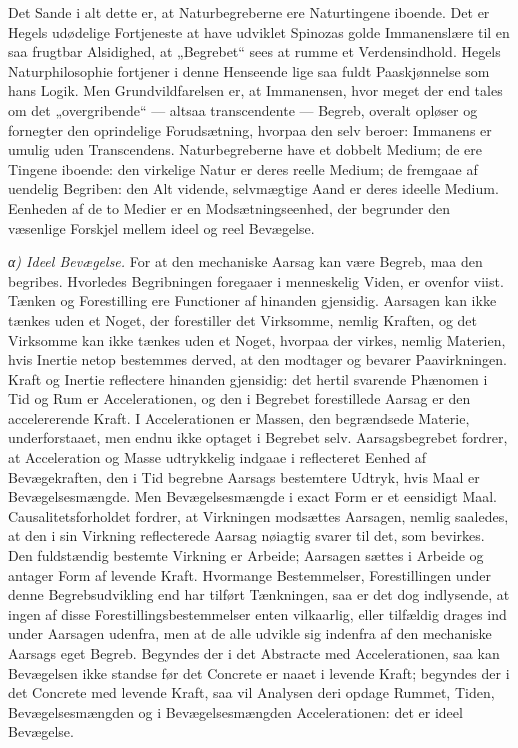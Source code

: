 \documentclass[12pt,a4paper]{book}
\newcommand{\subrunin}[1]{\emph{#1}\hspace{0.4em}}
\begin{document}
Det Sande i alt dette er, at Naturbegreberne ere Naturtingene iboende.
Det er Hegels udødelige Fortjeneste at have udviklet Spinozas golde
Immanenslære til en saa frugtbar Alsidighed, at „Begrebet“ sees at
rumme et Verdensindhold. Hegels Naturphilosophie fortjener i denne
Henseende lige saa fuldt Paaskjønnelse som hans Logik. Men
Grundvildfarelsen er, at Immanensen, hvor meget der end tales om det
„overgribende“ --- altsaa transcendente --- Begreb, overalt opløser og
fornegter den oprindelige Forudsætning, hvorpaa den selv beroer:
Immanens er umulig uden Transcendens. Naturbegreberne have et dobbelt
Medium; de ere Tingene iboende: den virkelige Natur er deres reelle
Medium; de fremgaae af uendelig Begriben: den Alt vidende, selvmægtige
Aand er deres ideelle Medium. Eenheden af de to Medier er en
Modsætningseenhed, der begrunder den væsenlige Forskjel mellem ideel og
reel Bevægelse.

\subrunin{α) Ideel Bevægelse.} For at den mechaniske Aarsag kan være
Begreb, maa den begribes. Hvorledes Begribningen foregaaer i
menneskelig Viden, er ovenfor viist. Tænken og Forestilling ere
Functioner af hinanden gjensidig. Aarsagen kan ikke tænkes uden et
Noget, der forestiller det Virksomme, nemlig Kraften, og det Virksomme
kan ikke tænkes uden et Noget, hvorpaa der virkes, nemlig Materien,
hvis Inertie netop bestemmes derved, at den modtager og bevarer
Paavirkningen. Kraft og Inertie reflectere hinanden gjensidig: det
hertil svarende Phænomen i Tid og Rum er Accelerationen, og den i
Begrebet forestillede Aarsag er den
accelererende Kraft. I Accelerationen er Massen, den begrændsede
Materie, underforstaaet, men endnu ikke optaget i Begrebet selv.
Aarsagsbegrebet fordrer, at Acceleration og Masse udtrykkelig indgaae i
reflecteret Eenhed af Bevægekraften, den i Tid begrebne Aarsags
bestemtere Udtryk, hvis Maal er Bevægelsesmængde. Men Bevægelsesmængde
i exact Form er et eensidigt Maal. Causalitetsforholdet fordrer, at
Virkningen modsættes Aarsagen, nemlig saaledes, at den i sin Virkning
reflecterede Aarsag nøiagtig svarer til det, som bevirkes. Den
fuldstændig bestemte Virkning er Arbeide; Aarsagen sættes i Arbeide og
antager Form af levende Kraft. Hvormange Bestemmelser, Forestillingen
under denne Begrebsudvikling end har tilført Tænkningen, saa er det dog
indlysende, at ingen af disse Forestillingsbestemmelser enten
vilkaarlig, eller tilfældig drages ind under Aarsagen udenfra, men at
de alle udvikle sig indenfra af den mechaniske Aarsags eget Begreb.
Begyndes der i det Abstracte med Accelerationen, saa kan Bevægelsen
ikke standse før det Concrete er naaet i levende Kraft; begyndes der i
det Concrete med levende Kraft, saa vil Analysen deri opdage Rummet,
Tiden, Bevægelsesmængden og i Bevægelsesmængden Accelerationen: det er
ideel Bevægelse.
\end{document}
